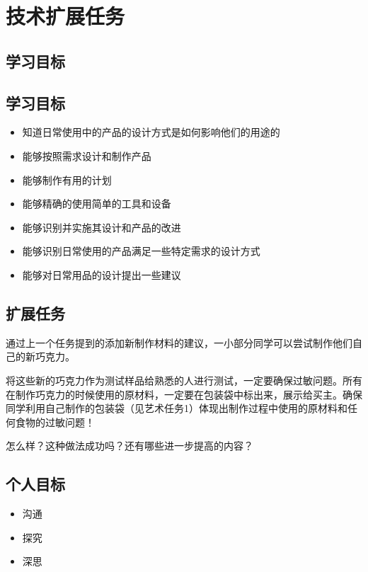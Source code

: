 \chapter{技术扩展任务}


\section{学习目标}

 
\section{学习目标}
  \begin{itemize}
    \item 知道日常使用中的产品的设计方式是如何影响他们的用途的
    \item 能够按照需求设计和制作产品
    \item 能够制作有用的计划
    \item 能够精确的使用简单的工具和设备
    \item 能够识别并实施其设计和产品的改进
    \item 能够识别日常使用的产品满足一些特定需求的设计方式
    \item 能够对日常用品的设计提出一些建议
  \end{itemize}  
   


\section{扩展任务}
    通过上一个任务提到的添加新制作材料的建议，一小部分同学可以尝试制作他们自己的新巧克力。\par
    将这些新的巧克力作为测试样品给熟悉的人进行测试，一定要确保过敏问题。所有在制作巧克力的时候使用的原材料，一定要在包装袋中标出来，展示给买主。确保同学利用自己制作的包装袋（见艺术任务1）体现出制作过程中使用的原材料和任何食物的过敏问题！\par
    怎么样？这种做法成功吗？还有哪些进一步提高的内容？\par

\section{个人目标}
 
\begin{itemize}
  \item 沟通
  \item 探究
  \item 深思
\end{itemize}
